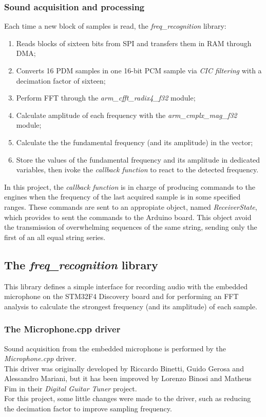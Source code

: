 \subsubsection{Sound acquisition and processing}
Each time a new block of samples is read, the \textit{freq\_recognition} library:
\begin{enumerate}
	\item Reads blocks of sixteen bits from SPI and transfers them in RAM through DMA;
	\item Converts 16 PDM samples in one 16-bit PCM sample via \textit{CIC filtering} with a decimation factor of sixteen;
	\item Perform FFT through the \textit{arm\_cfft\_radix4\_f32} module;
	\item Calculate amplitude of each frequency with the \textit{arm\_cmplx\_mag\_f32} module;
	\item Calculate the the fundamental frequency (and its amplitude) in the vector;
	\item Store the values of the fundamental frequency and its amplitude in dedicated variables, then ivoke the \textit{callback function} to react to the detected frequency.
\end{enumerate}
In this project, the \textit{callback function} is in charge of producing commands to the engines when the frequency of the last acquired sample is in some specified ranges. These commands are sent to an appropiate object, named \textit{ReceiverState}, which provides to sent the commands to the Arduino board. This object avoid the transmission of overwhelming sequences of the same string, sending only the first of an all equal string series.


\subsection{The \textit{freq\_recognition} library}
This library defines a simple interface for recording audio with the embedded microphone on the STM32F4 Discovery board and for performing an FFT analysis to calculate the strongest frequency (and its amplitude) of each sample.

\subsubsection{The Microphone.cpp driver}
Sound acquisition from the embedded microphone is performed by the \textit{Microphone.cpp} driver. \\
This driver was originally developed by Riccardo Binetti, Guido Gerosa and Alessandro Mariani, but it has been improved by Lorenzo Binosi and Matheus Fim in their \textit{Digital Guitar Tuner} project. \\
For this project, some little changes were made to the driver, such as reducing the decimation factor to improve sampling frequency.

